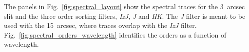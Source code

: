 \documentclass[a4paper,twoside,11pt]{article}
\begin{document}
The panels in Fig.~\ref{fig:spectral_layout} show the spectral traces
for the 3~arcsec slit and the three order sorting filters,
\textit{IzJ}, \textit{J} and \textit{HK}. The \textit{J} filter is
meant to be used with the 15~arcsec, where traces overlap with the
\textit{IzJ} filter. Fig.~\ref{fig:spectral_orders_wavelength}
identifies the orders as a function of wavelength.

\begin{figure}[hb]
  \centering
  \\

\end{figure}
\end{document}
